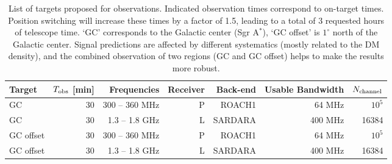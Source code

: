 \documentclass[a4paper, 11pt]{article}
\begin{document}
\begin{table}[htb]
  \centering
  \caption{List of targets proposed for observations.  Indicated observation times correspond to on-target times. Position switching will increase these times by a factor of 1.5, leading to a total of 3 requested hours of telescope time.  `GC' corresponds to the Galactic center (Sgr A$^\ast$), `GC offset' is $1^\circ$ north of the Galactic center.  Signal predictions are affected by different systematics (mostly related to the DM density), and the combined observation of two regions (GC and GC offset) helps to make the results more robust.  
  \label{tab:label}
  }
  \vskip 2mm
  \begin{tabular}{lrrrrrr}
    \hline
    Target & $T_{\rm obs}$ [min] & Frequencies & Receiver & Back-end & Usable Bandwidth & $N_{\rm channel}$ \\
    \hline
    \hline
    GC & 30 & 300 -- 360 MHz & P & ROACH1 & 64 MHz & $10^5$  \\
    GC & 30 & 1.3 -- 1.8 GHz & L & SARDARA & 400 MHz & 16384  \\
    GC offset & 30 & 300 -- 360 MHz & P & ROACH1 & 64 MHz & $10^5$ \\
    GC offset & 30 & 1.3 -- 1.8 GHz & L & SARDARA & 400 MHz & 16384  \\
    \hline
  \end{tabular}
\end{table}
\end{document}
